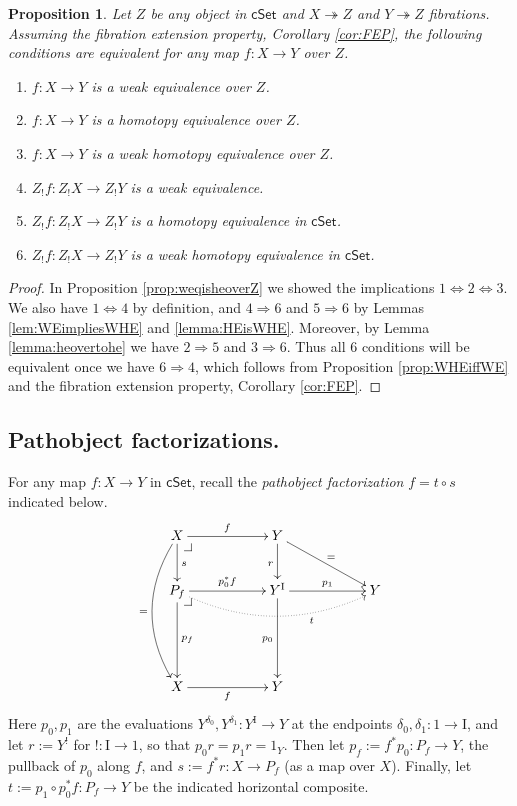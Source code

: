 \documentclass[11pt,reqno]{amsart}
\makeatletter
\newcommand{\cSet}{\ensuremath{\mathsf{cSet}}}
\newcommand{\ra}{\ensuremath{\rightarrow}}
\newcommand{\fib}{\ensuremath{\twoheadrightarrow}}
\renewcommand{\to}{\ensuremath{\rightarrow}}
\newcommand{\I}{\ensuremath{\mathrm{I}}}
\newtheorem{proposition}[theorem]{Proposition}
\theoremstyle{remark}
\theoremstyle{definition}
\newcommand{\pbcorner}[1][dr]{\save*!/#1-1.2pc/#1:(-1,1)@^{|-}\restore}
\makeatother
\begin{document}
\begin{proposition}\label{prop:slicedheweequiv}
Let $Z$ be any object in $\cSet$ and $X \fib Z$ and $Y \fib Z$ fibrations.   \emph{Assuming the fibration extension property}, Corollary \ref{cor:FEP}, the following conditions are equivalent for any map $f : X\to Y$ over $Z$.
%
\begin{enumerate}
\item $f : X\to Y$  is a weak equivalence over $Z$. 
%
\item $f : X\to Y$   is a  homotopy equivalence over $Z$. 
%
\item $f : X\to Y$   is a weak homotopy equivalence over $Z$. 
%
\item $Z_!f : Z_!X\to Z_!Y$ is a weak equivalence. 
%
\item $Z_!f : Z_!X\to Z_!Y$ is a homotopy equivalence in $\cSet$. 
%
\item $Z_!f : Z_!X\to Z_!Y$ is a weak homotopy equivalence in $\cSet$. 
%
\end{enumerate}
\end{proposition} 

\begin{proof}
In Proposition \ref{prop:weqisheoverZ}  we showed the implications $1\Leftrightarrow 2 \Leftrightarrow 3$.
We also have $1\Leftrightarrow 4$ by definition, and $4\Rightarrow 6$ and $5 \Rightarrow 6$ by Lemmas \ref{lem:WEimpliesWHE} and \ref{lemma:HEisWHE}.  Moreover, by Lemma \ref{lemma:heovertohe} we have $2\Rightarrow 5$ and $3\Rightarrow 6$.  
Thus all 6 conditions will be equivalent once we have $6\Rightarrow 4$, which follows from Proposition \ref{prop:WHEiffWE} and the fibration extension property, Corollary \ref{cor:FEP}. 
\end{proof}


\subsection*{Pathobject factorizations.}

For any map $f :X\ra Y$ in $\cSet$, recall the \emph{pathobject factorization} $f = t\circ s$ indicated below.
\begin{equation}\label{diag:pathspace_factorization}
\xymatrix{
X \ar@/_1.5pc/[ddd]_= \ar[d]^s \ar[rr]^f \pbcorner && Y \ar[d]_r \ar[rrd]^=\\
P_f  \ar[dd]^{p_f} \ar[rr]^{p_0^*f} \ar@{.>}@/_1.5pc/[rrrr]_<<<<<<<<<<<<<<<t \pbcorner && Y^\I \ar[dd]_{p_0} \ar[rr]^-{p_1} && Y \\
\\
X \ar[rr]_f  &&  Y &
}
\end{equation}
Here $p_0, p_1$ are the evaluations $Y^{\delta_{0}}, Y^{\delta_{1}} : Y^\I \to Y$ at the endpoints $\delta_0, \delta_1 : 1\ra\I$, and let $r:= Y^!$ for $! : \I\ra 1$, so that $p_0r = p_1r = 1_Y$.  Then let  $p_f := f^*p_0 : P_f \ra Y$, the pullback of $p_0$ along $f$, and $s:= f^*r : X\ra P_f$ (as a map over $X$).  Finally, let $t:= p_1\circ p_0^*f : P_f \ra Y$ be the indicated horizontal composite. 
\end{document}
